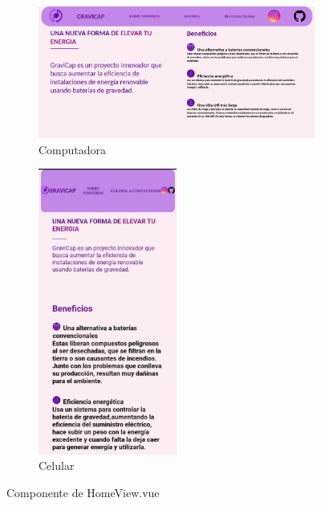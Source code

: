                     \begin{figure} [H]
                    \centering
                    \begin{subfigure}{0.5\textwidth}
                        \centering
                        \includegraphics[width=\textwidth]{Imagenes/Página Web/Computadora/HomeScreen.jpg}
                        \caption{Computadora}
                        \label{fig:pw2.1}
                    \end{subfigure}
                    \hfill
                    \begin{subfigure}{0.4\textwidth}
                        \centering
                        \includegraphics[width=0.5\textwidth]{Imagenes/Página Web/Celular/Homescreen.jpg}
                        \caption{Celular}
                        \label{fig:pw2.2}
                    \end{subfigure}
                    \hfill
                            
                    \caption{Componente de HomeView.vue}
                    \label{fig:pw2}
                    \end{figure}
                    
